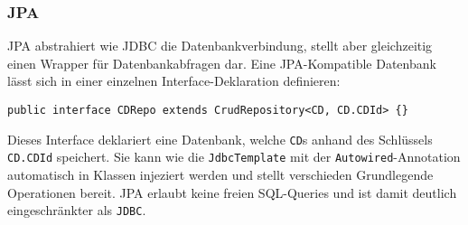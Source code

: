 \documentclass{article}
\begin{document}
\subsubsection{JPA}

JPA abstrahiert wie JDBC die Datenbankverbindung, stellt aber gleichzeitig einen Wrapper für Datenbankabfragen dar. Eine JPA-Kompatible Datenbank lässt sich in einer einzelnen Interface-Deklaration definieren:

\begin{lstlisting}
public interface CDRepo extends CrudRepository<CD, CD.CDId> {}
\end{lstlisting}

Dieses Interface deklariert eine Datenbank, welche \texttt{CD}s anhand des Schlüssels \texttt{CD.CDId} speichert.
 Sie kann wie die \texttt{JdbcTemplate} mit der \texttt{Autowired}-Annotation automatisch in Klassen injeziert werden und stellt verschieden Grundlegende Operationen bereit.
 JPA erlaubt keine freien SQL-Queries und ist damit deutlich eingeschränkter als \texttt{JDBC}.
\end{document}
